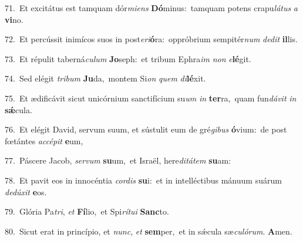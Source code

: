 {\numbfont\textcolor{\numbcolor}{71.}}~Et excitátus est tamquam dór\-\textit{mi}\-\textit{ens} \textbf{Dó}\-minus:~\star tamquam potens crapu\-\textit{lá}\-\textit{tus} \textit{a} \textbf{vi}\-no.\par
{\numbfont\textcolor{\numbcolor}{72.}}~Et percússit inimícos suos in post\-\textit{e}\-\textit{ri}\textbf{ó}ra:~\star oppróbrium sempitér\textit{num} \textit{de}\-\textit{dit} \textbf{il}\-lis.\par
{\numbfont\textcolor{\numbcolor}{73.}}~Et répulit taberná\-\textit{cu}\-\textit{lum} \textbf{Jo}\-seph:~\star et tribum Ephra\textit{im} \textit{non} \textit{e}\-\textbf{lé}git.\par
{\numbfont\textcolor{\numbcolor}{74.}}~Sed elégit \textit{tri}\-\textit{bum} \textbf{Ju}\-da,~\star montem Si\textit{on} \textit{quem} \textit{di}\-\textbf{lé}xit.\par
{\numbfont\textcolor{\numbcolor}{75.}}~Et ædificávit sicut unicórnium sanctifícium su\textit{um} \textit{in} \textbf{ter}\-ra,~\star quam fun\-\textit{dá}\-\textit{vit} \textit{in} \textbf{sǽ}\-cula.\par
{\numbfont\textcolor{\numbcolor}{76.}}~Et elégit David, servum suum, et sústulit eum de gré\-\textit{gi}\-\textit{bus} \textbf{ó}\-vium:~\star de post fœtántes \textit{ac}\-\textit{cé}\textit{pit} \textbf{e}\-um,\par
{\numbfont\textcolor{\numbcolor}{77.}}~Páscere Jacob, \textit{ser}\-\textit{vum} \textbf{su}\-um,~\star et Israël, here\-\textit{di}\-\textit{tá}\textit{tem} \textbf{su}\-am:\par
{\numbfont\textcolor{\numbcolor}{78.}}~Et pavit eos in innocéntia \textit{cor}\-\textit{dis} \textbf{su}\-i:~\star et in intelléctibus mánuum suárum \textit{de}\-\textit{dú}\textit{xit} \textbf{e}\-os.\par
{\numbfont\textcolor{\numbcolor}{79.}}~Glória Pa\-\textit{tri}\-, \textit{et} \textbf{Fí}\-lio,~\star et Spi\-\textit{rí}\-\textit{tu}\textit{i} \textbf{Sanc}\-to.\par
{\numbfont\textcolor{\numbcolor}{80.}}~Sicut erat in princípio, et \textit{nunc}\-, \textit{et} \textbf{sem}\-per,~\star et in sǽcula sæ\-\textit{cu}\-\textit{ló}\textit{rum}. \textbf{A}\-men.\par
